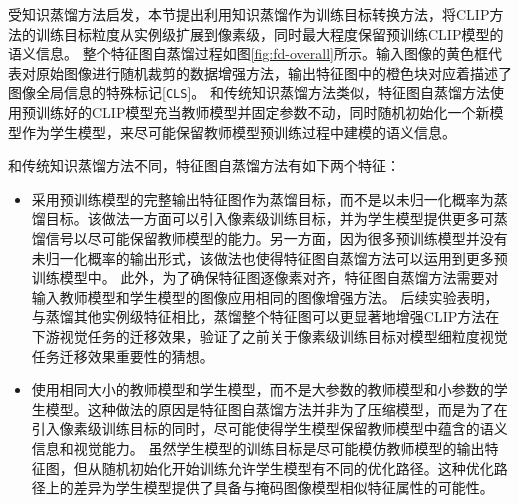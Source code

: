 受知识蒸馏方法启发，本节提出利用知识蒸馏作为训练目标转换方法，将CLIP方法的训练目标粒度从实例级扩展到像素级，同时最大程度保留预训练CLIP模型的语义信息。
整个特征图自蒸馏过程如图\ref{fig:fd-overall}所示。输入图像的黄色框代表对原始图像进行随机裁剪的数据增强方法，输出特征图中的橙色块对应着描述了图像全局信息的特殊标记[\texttt{CLS}]。
和传统知识蒸馏方法类似，特征图自蒸馏方法使用预训练好的CLIP模型充当教师模型并固定参数不动，同时随机初始化一个新模型作为学生模型，来尽可能保留教师模型预训练过程中建模的语义信息。%

和传统知识蒸馏方法不同，特征图自蒸馏方法有如下两个特征：
\begin{itemize}
    \item 采用预训练模型的完整输出特征图作为蒸馏目标，而不是以未归一化概率为蒸馏目标\cite{hinton2015knowledge,deit}。该做法一方面可以引入像素级训练目标，并为学生模型提供更多可蒸馏信号以尽可能保留教师模型的能力。另一方面，因为很多预训练模型\cite{dino}并没有未归一化概率的输出形式，该做法也使得特征图自蒸馏方法可以运用到更多预训练模型中。
    此外，为了确保特征图逐像素对齐，特征图自蒸馏方法需要对输入教师模型和学生模型的图像应用相同的图像增强方法。
    后续实验表明，与蒸馏其他实例级特征相比，蒸馏整个特征图可以更显著地增强CLIP方法在下游视觉任务的迁移效果，验证了之前关于像素级训练目标对模型细粒度视觉任务迁移效果重要性的猜想。
    \item 使用相同大小的教师模型和学生模型，而不是大参数的教师模型和小参数的学生模型。这种做法的原因是特征图自蒸馏方法并非为了压缩模型，而是为了在引入像素级训练目标的同时，尽可能使得学生模型保留教师模型中蕴含的语义信息和视觉能力。
    虽然学生模型的训练目标是尽可能模仿教师模型的输出特征图，但从随机初始化开始训练允许学生模型有不同的优化路径。这种优化路径上的差异为学生模型提供了具备与掩码图像模型相似特征属性的可能性。
\end{itemize}


